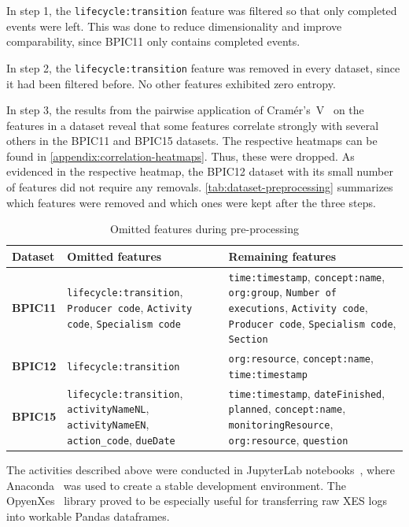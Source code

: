 In step 1, the \verb=lifecycle:transition= feature was filtered so that only completed events were left. This was done to reduce dimensionality and improve comparability, since BPIC11 only contains completed events.

In step 2, the \verb=lifecycle:transition= feature was removed in every dataset, since it had been filtered before. No other features exhibited zero entropy.

In step 3, the results from the pairwise application of Cramér's~V~\cite{bergsma2013bias} on the features in a dataset reveal that some features correlate strongly with several others in the BPIC11 and BPIC15 datasets. The respective heatmaps can be found in \autoref{appendix:correlation-heatmaps}. Thus, these were dropped. As evidenced in the respective heatmap, the BPIC12 dataset with its small number of features did not require any removals. \autoref{tab:dataset-preprocessing} summarizes which features were removed and which ones were kept after the three steps.

\begin{table}[!htb]
\centering
\begin{adjustbox}{center}
\begin{tabular}{lp{6cm}p{6cm}}
\textbf{Dataset} & \textbf{Omitted features} & \textbf{Remaining features}\\
\hline
\textbf{BPIC11} & \verb=lifecycle:transition=, \verb=Producer code=,  \verb=Activity code=,  \verb=Specialism code= & \verb=time:timestamp=, \verb=concept:name=, \verb=org:group=, \verb=Number of executions=, \verb=Activity code=, \verb=Producer code=, \verb=Specialism code=, \verb=Section=\\
\textbf{BPIC12} & \verb=lifecycle:transition= & \verb=org:resource=, \verb=concept:name=, \verb=time:timestamp=\\
\textbf{BPIC15} & \verb=lifecycle:transition=, \verb=activityNameNL=, \verb=activityNameEN=, \verb=action_code=, \verb=dueDate= & \verb=time:timestamp=, \verb=dateFinished=, \verb=planned=, \verb=concept:name=, \verb=monitoringResource=, \verb=org:resource=, 	\verb=question=
\end{tabular}
\end{adjustbox}
\caption{Omitted features during pre-processing}
\label{tab:dataset-preprocessing}
\end{table}

The activities described above were conducted in JupyterLab notebooks~\cite{web:jupyter}, where Anaconda~\cite{web:anaconda} was used to create a stable development environment. The OpyenXes~\cite{web:opyenxes} library proved to be especially useful for transferring raw XES logs into workable Pandas dataframes.

